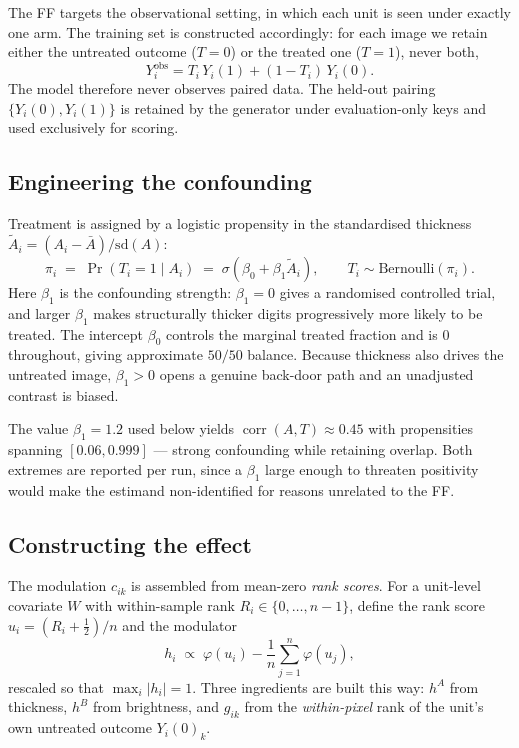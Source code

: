 The FF targets the observational setting, in which each unit is seen under exactly one arm.
The training set is constructed accordingly: for each image we retain either the untreated
outcome ($T = 0$) or the treated one ($T = 1$), never both,
\begin{equation}
    Y_i^{\mathrm{obs}} = T_i \, Y_i(1) + (1 - T_i)\, Y_i(0).
\end{equation}
The model therefore never observes paired data. The held-out pairing $\{Y_i(0), Y_i(1)\}$ is
retained by the generator under evaluation-only keys and used exclusively for scoring.

\subsection{Engineering the confounding}

Treatment is assigned by a logistic propensity in the standardised thickness
$\tilde{A}_i = (A_i - \bar{A})/\mathrm{sd}(A)$:
\begin{equation}
    \pi_i \;=\; \Pr(T_i = 1 \mid A_i) \;=\; \sigma\!\left(\beta_0 + \beta_1 \tilde{A}_i\right),
    \qquad T_i \sim \mathrm{Bernoulli}(\pi_i).
    \label{eq:propensity}
\end{equation}
Here $\beta_1$ is the confounding strength: $\beta_1 = 0$ gives a randomised controlled trial,
and larger $\beta_1$ makes structurally thicker digits progressively more likely to be
treated. The intercept $\beta_0$ controls the marginal treated fraction and is $0$ throughout,
giving approximate $50/50$ balance. Because thickness also drives the untreated image,
$\beta_1 > 0$ opens a genuine back-door path and an unadjusted contrast is biased.

The value $\beta_1 = 1.2$ used below yields $\operatorname{corr}(A, T) \approx 0.45$ with
propensities spanning $[0.06, 0.999]$ --- strong confounding while retaining overlap. Both
extremes are reported per run, since a $\beta_1$ large enough to threaten positivity would
make the estimand non-identified for reasons unrelated to the FF.

\subsection{Constructing the effect}
\label{sec:effect-construction}

The modulation $c_{ik}$ is assembled from mean-zero \emph{rank scores}. For a unit-level
covariate $W$ with within-sample rank $R_i \in \{0, \ldots, n-1\}$, define the rank score
$u_i = (R_i + \tfrac12)/n$ and the modulator
\begin{equation}
    h_i \;\propto\; \varphi(u_i) - \frac{1}{n}\sum_{j=1}^{n} \varphi(u_j),
    \label{eq:modulator}
\end{equation}
rescaled so that $\max_i |h_i| = 1$. Three ingredients are built this way: $h^{A}$ from
thickness, $h^{B}$ from brightness, and $g_{ik}$ from the \emph{within-pixel} rank of the
unit's own untreated outcome $Y_i(0)_k$.

